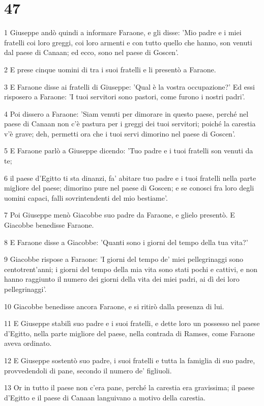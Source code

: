 \chapter{47}

\par 1 Giuseppe andò quindi a informare Faraone, e gli disse: 'Mio padre e i miei fratelli coi loro greggi, coi loro armenti e con tutto quello che hanno, son venuti dal paese di Canaan; ed ecco, sono nel paese di Goscen'.
\par 2 E prese cinque uomini di tra i suoi fratelli e li presentò a Faraone.
\par 3 E Faraone disse ai fratelli di Giuseppe: 'Qual è la vostra occupazione?' Ed essi risposero a Faraone: 'I tuoi servitori sono pastori, come furono i nostri padri'.
\par 4 Poi dissero a Faraone: 'Siam venuti per dimorare in questo paese, perché nel paese di Canaan non c'è pastura per i greggi dei tuoi servitori; poiché la carestia v'è grave; deh, permetti ora che i tuoi servi dimorino nel paese di Goscen'.
\par 5 E Faraone parlò a Giuseppe dicendo: 'Tuo padre e i tuoi fratelli son venuti da te;
\par 6 il paese d'Egitto ti sta dinanzi, fa' abitare tuo padre e i tuoi fratelli nella parte migliore del paese; dimorino pure nel paese di Goscen; e se conosci fra loro degli uomini capaci, falli sovrintendenti del mio bestiame'.
\par 7 Poi Giuseppe menò Giacobbe suo padre da Faraone, e glielo presentò. E Giacobbe benedisse Faraone.
\par 8 E Faraone disse a Giacobbe: 'Quanti sono i giorni del tempo della tua vita?'
\par 9 Giacobbe rispose a Faraone: 'I giorni del tempo de' miei pellegrinaggi sono centotrent'anni; i giorni del tempo della mia vita sono stati pochi e cattivi, e non hanno raggiunto il numero dei giorni della vita dei miei padri, ai dì dei loro pellegrinaggi'.
\par 10 Giacobbe benedisse ancora Faraone, e si ritirò dalla presenza di lui.
\par 11 E Giuseppe stabilì suo padre e i suoi fratelli, e dette loro un possesso nel paese d'Egitto, nella parte migliore del paese, nella contrada di Ramses, come Faraone aveva ordinato.
\par 12 E Giuseppe sostentò suo padre, i suoi fratelli e tutta la famiglia di suo padre, provvedendoli di pane, secondo il numero de' figliuoli.
\par 13 Or in tutto il paese non c'era pane, perché la carestia era gravissima; il paese d'Egitto e il paese di Canaan languivano a motivo della carestia.
